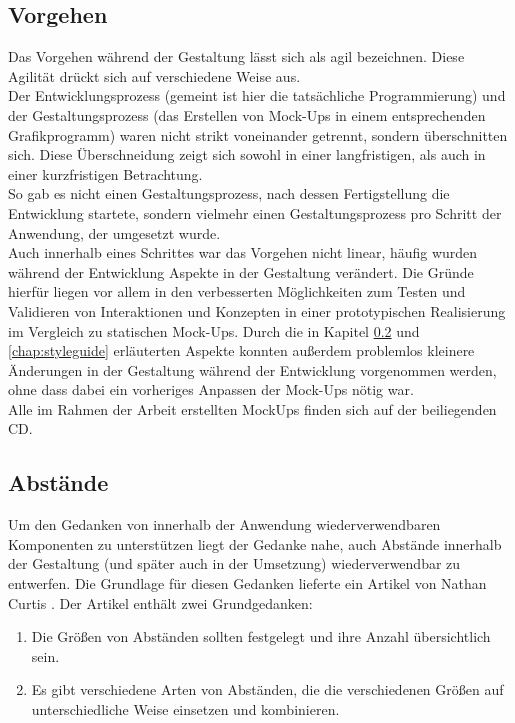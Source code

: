 \subsection{Vorgehen}
Das Vorgehen während der Gestaltung lässt sich als agil bezeichnen. Diese Agilität drückt sich auf verschiedene Weise aus.\\
Der Entwicklungsprozess (gemeint ist hier die tatsächliche Programmierung) und der Gestaltungsprozess (das Erstellen von Mock-Ups in einem entsprechenden Grafikprogramm) waren nicht strikt voneinander getrennt, sondern überschnitten sich. Diese Überschneidung zeigt sich sowohl in einer langfristigen, als auch in einer kurzfristigen Betrachtung.\\
So gab es nicht einen Gestaltungsprozess, nach dessen Fertigstellung die Entwicklung startete, sondern vielmehr einen Gestaltungsprozess pro Schritt der Anwendung, der umgesetzt wurde.\\
Auch innerhalb eines Schrittes war das Vorgehen nicht linear, häufig wurden während der Entwicklung Aspekte in der Gestaltung verändert. Die Gründe hierfür liegen vor allem in den verbesserten Möglichkeiten zum Testen und Validieren von Interaktionen und Konzepten in einer prototypischen Realisierung im Vergleich zu statischen Mock-Ups.
Durch die in Kapitel \ref{chap:spacing} und \ref{chap:styleguide} erläuterten Aspekte konnten außerdem problemlos kleinere Änderungen in der Gestaltung während der Entwicklung vorgenommen werden, ohne dass dabei ein vorheriges Anpassen der Mock-Ups nötig war.\\
Alle im Rahmen der Arbeit erstellten MockUps finden sich auf der beiliegenden CD.

\subsection{Abstände}
\label{chap:spacing}
Um den Gedanken von innerhalb der Anwendung wiederverwendbaren Komponenten zu unterstützen liegt der Gedanke nahe, auch Abstände innerhalb der Gestaltung (und später auch in der Umsetzung) wiederverwendbar zu entwerfen. Die Grundlage für diesen Gedanken lieferte ein Artikel von Nathan Curtis \cite{CurtisSpace16}. Der Artikel enthält zwei Grundgedanken:

\begin{enumerate}
  \item Die Größen von Abständen sollten festgelegt und ihre Anzahl übersichtlich sein.
  \item Es gibt verschiedene Arten von Abständen, die die verschiedenen Größen auf unterschiedliche Weise einsetzen und kombinieren.
\end{enumerate}

